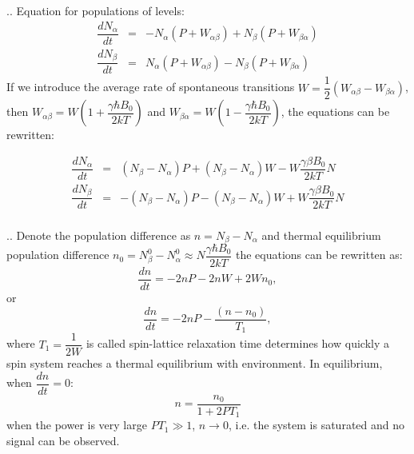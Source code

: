 \documentclass{beamer}
\begin{document}
\begin{frame}{\thesection.\thesubsection. \insertsubsection}
		Equation for populations of levels:
		\begin{equation}
		\begin{array}{lcl}
		\dfrac{dN_{\alpha}}{dt} &=& -N_{\alpha}(P + W_{\alpha \beta}) + N_{\beta}(P+W_{\beta \alpha})  \\
		\dfrac{dN_{\beta}}{dt} &=&  N_{\alpha}(P + W_{\alpha \beta}) - N_{\beta}(P+W_{\beta \alpha})  
		\end{array}
		\end{equation}
		\onslide<2->
		If we introduce the average rate of spontaneous transitions $W = \dfrac{1}{2}(W_{\alpha \beta} - W_{\beta \alpha})$, then $W_{\alpha \beta} = W(1 + \dfrac{\gamma \hbar B_0}{2kT})$ and $W_{ \beta \alpha} = W(1 - \dfrac{\gamma \hbar B_0}{2kT})$, the equations can be rewritten:
		
		\begin{equation}
		\begin{array}{lcl}
		\dfrac{dN_{\alpha}}{dt} &=& (N_{\beta} - N_{\alpha})P + (N_{\beta} - N_{\alpha})W - W\dfrac{\gamma \beta B_0}{2kT}N \\
		\dfrac{dN_{\beta}}{dt} &=& -(N_{\beta} - N_{\alpha})P - (N_{\beta} - N_{\alpha})W + W\dfrac{\gamma \beta B_0}{2kT}N \\
		\end{array}
		\end{equation}		
\end{frame}

\begin{frame}{\thesection.\thesubsection. \insertsubsection}
 Denote the population difference as $n = N_{\beta} - N_{\alpha}$ and thermal equilibrium population difference $n_0 = N_{\beta}^0 - N_{\alpha}^0 \approx N\dfrac{\gamma \hbar B_0}{2kT}$ the equations can be rewritten as:
		\begin{equation}
		   \dfrac{dn}{dt} = - 2 n P - 2 n W + 2W n_0,
		\end{equation}
		or
		\begin{equation}
		    \dfrac{dn}{dt} = - 2 n P -\dfrac{ (n - n_0)}{T_1},
		\end{equation}
		where $T_1 = \dfrac{1}{2W}$ is called \alert{spin-lattice relaxation time} determines how quickly a spin system reaches a thermal equilibrium with environment.
		\onslide<2-> In equilibrium, when $\dfrac{dn}{dt} = 0$:
		\begin{equation}
			n = \dfrac{n_0}{1 + 2 P T_1}
		\end{equation}
		when the power is very large $PT_1 \gg 1$, $n \rightarrow 0$, i.e. the system is \alert{saturated} and no signal can be observed.

\end{frame}
\end{document}
